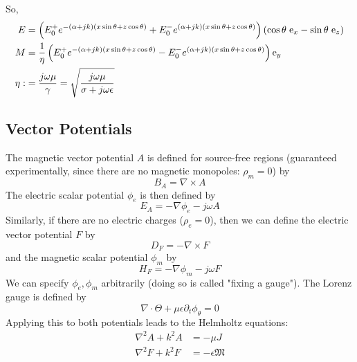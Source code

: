 \documentclass{article}
\numberwithin{equation}{section}
\begin{document}
So,
\scriptsize
\begin{subequations}
    \begin{align}
        E &= \left( E_0^+ e^{-(\alpha + jk)(x \sin \theta + z \cos \theta)} + E_0^- e^{(\alpha + jk)(x \sin \theta + z \cos \theta)} \right) ( \cos \theta \hspace{0.3em} \text{e}_x - \sin \theta \hspace{0.3em} \text{e}_z ) \\
        M &= \frac{1}{\eta} \left( E_0^+ e^{-(\alpha + jk)(x \sin \theta + z \cos \theta)} - E_0^- e^{(\alpha + jk )(x \sin \theta + z \cos \theta)} \right) \text{e}_y \\
        \eta :&= \frac{j \omega \mu }{\gamma} = \sqrt{\frac{j \omega \mu}{\sigma + j \omega \epsilon}}
    \end{align}
\end{subequations}
\normalsize
\subsection{Vector Potentials}
The magnetic vector potential $A$ is defined for source-free regions (guaranteed experimentally, since there are no magnetic monopoles: $\rho_m = 0$) by
\begin{equation} \label{eq:magneticVectorPotential}
    B_A = \nabla \times A 
\end{equation}
The electric scalar potential $\phi_e$ is then defined by
\begin{equation} \label{eq:electricScalarPotential}
    E_A = - \nabla \phi_e -j \omega A 
\end{equation}
Similarly, if there are no electric charges ($\rho_e = 0$), then we can define the electric vector potential $F$ by
\begin{equation} \label{eq:electricVectorPotential}
    D_F = - \nabla \times F 
\end{equation}
and the magnetic scalar potential $\phi_m$ by
\begin{equation} \label{eq:magneticScalarPotential}
    H_F = - \nabla \phi_m -j \omega F 
\end{equation}
We can specify $\phi_e, \phi_m$ arbitrarily (doing so is called "fixing a gauge").
The Lorenz gauge is defined by
\begin{equation} \label{eq:LorenzGauge}
    \nabla \cdot \Theta + \mu \epsilon \partial_t \phi_{\theta} = 0 
\end{equation}
Applying this to both potentials leads to the Helmholtz equations:
\begin{subequations} \label{eq:Helmholtz}
    \begin{align}
        \nabla^2 A + k^2 A &= -\mu J \label{eq:HelmMag} \\
        \nabla^2 F + k^2 F &= -\epsilon \mathfrak{M} \label{eq:HelmElec}
    \end{align}
\end{subequations}
\end{document}
